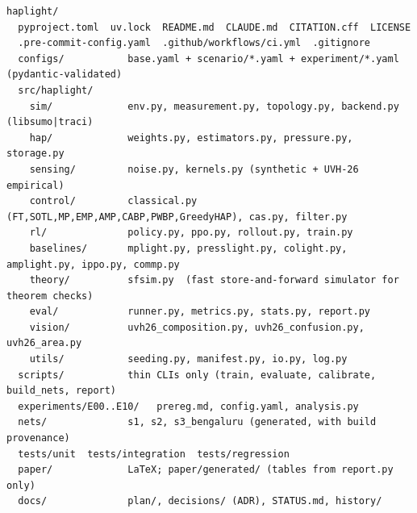 \documentclass[11pt,a4paper]{article}
\begin{document}
{\footnotesize
\begin{verbatim}
haplight/
  pyproject.toml  uv.lock  README.md  CLAUDE.md  CITATION.cff  LICENSE
  .pre-commit-config.yaml  .github/workflows/ci.yml  .gitignore
  configs/           base.yaml + scenario/*.yaml + experiment/*.yaml  (pydantic-validated)
  src/haplight/
    sim/             env.py, measurement.py, topology.py, backend.py (libsumo|traci)
    hap/             weights.py, estimators.py, pressure.py, storage.py
    sensing/         noise.py, kernels.py (synthetic + UVH-26 empirical)
    control/         classical.py (FT,SOTL,MP,EMP,AMP,CABP,PWBP,GreedyHAP), cas.py, filter.py
    rl/              policy.py, ppo.py, rollout.py, train.py
    baselines/       mplight.py, presslight.py, colight.py, amplight.py, ippo.py, commp.py
    theory/          sfsim.py  (fast store-and-forward simulator for theorem checks)
    eval/            runner.py, metrics.py, stats.py, report.py
    vision/          uvh26_composition.py, uvh26_confusion.py, uvh26_area.py
    utils/           seeding.py, manifest.py, io.py, log.py
  scripts/           thin CLIs only (train, evaluate, calibrate, build_nets, report)
  experiments/E00..E10/   prereg.md, config.yaml, analysis.py
  nets/              s1, s2, s3_bengaluru (generated, with build provenance)
  tests/unit  tests/integration  tests/regression
  paper/             LaTeX; paper/generated/ (tables from report.py only)
  docs/              plan/, decisions/ (ADR), STATUS.md, history/
\end{verbatim}
}
\end{document}
